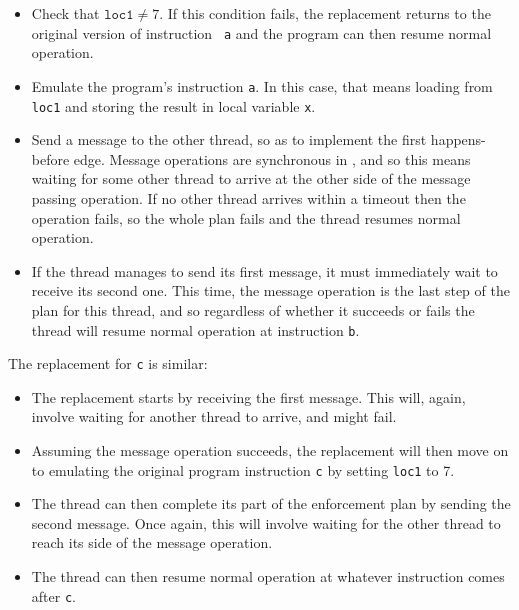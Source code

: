 \begin{itemize}
\item Check that $\mathtt{loc1} \not= 7$.  If this condition fails,
  the replacement returns to the original version of instruction {\tt
    a} and the program can then resume normal operation.
\item Emulate the program's instruction {\tt a}.  In this case, that
  means loading from {\tt loc1} and storing the result in local
  variable {\tt x}.
\item Send a message to the other thread, so as to implement the first
  happens-before edge.  Message operations are synchronous in
  {\implementation}, and so this means waiting for some other thread
  to arrive at the other side of the message passing operation.  If no
  other thread arrives within a timeout then the operation fails, so
  the whole plan fails and the thread resumes normal operation.
\item If the thread manages to send its first message, it must
  immediately wait to receive its second one.  This time, the message
  operation is the last step of the plan for this thread, and so
  regardless of whether it succeeds or fails the thread will resume
  normal operation at instruction {\tt b}.
\end{itemize}

The replacement for {\tt c} is similar:

\begin{itemize}
\item The replacement starts by receiving the first message.  This
  will, again, involve waiting for another thread to arrive, and might
  fail.
\item Assuming the message operation succeeds, the replacement will
  then move on to emulating the original program instruction {\tt c}
  by setting {\tt loc1} to 7.
\item The thread can then complete its part of the enforcement plan by
  sending the second message.  Once again, this will involve waiting
  for the other thread to reach its side of the message operation.
\item The thread can then resume normal operation at whatever
  instruction comes after {\tt c}.
\end{itemize}

